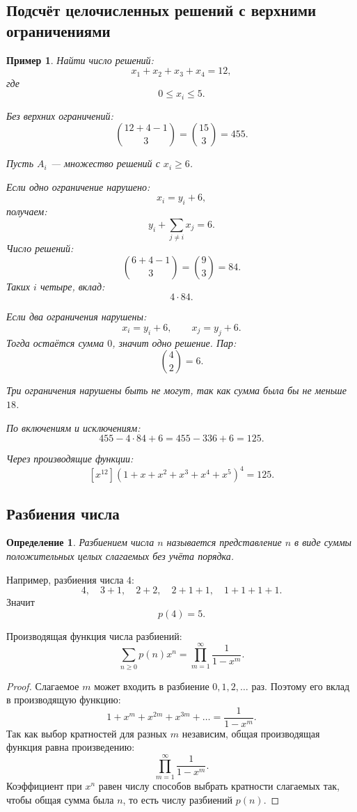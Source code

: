 \documentclass[12pt,a4paper]{article}
\newtheorem{definition}{Определение}
\newtheorem{example}{Пример}
\begin{document}
\subsection{Подсчёт целочисленных решений с верхними ограничениями}

\begin{example}
Найти число решений:
\[
x_1+x_2+x_3+x_4=12,
\]
где
\[
0\le x_i\le 5.
\]

Без верхних ограничений:
\[
\binom{12+4-1}{3}=\binom{15}{3}=455.
\]

Пусть $A_i$ --- множество решений с $x_i\ge 6$.

Если одно ограничение нарушено:
\[
x_i=y_i+6,
\]
получаем:
\[
y_i+\sum_{j\ne i}x_j=6.
\]
Число решений:
\[
\binom{6+4-1}{3}=\binom{9}{3}=84.
\]
Таких $i$ четыре, вклад:
\[
4\cdot 84.
\]

Если два ограничения нарушены:
\[
x_i=y_i+6,\qquad x_j=y_j+6.
\]
Тогда остаётся сумма $0$, значит одно решение. Пар:
\[
\binom{4}{2}=6.
\]

Три ограничения нарушены быть не могут, так как сумма была бы не меньше $18$.

По включениям и исключениям:
\[
455-4\cdot84+6=455-336+6=125.
\]

Через производящие функции:
\[
[x^{12}](1+x+x^2+x^3+x^4+x^5)^4=125.
\]
\end{example}

\subsection{Разбиения числа}

\begin{definition}
Разбиением числа $n$ называется представление $n$ в виде суммы положительных целых слагаемых без учёта порядка.
\end{definition}

Например, разбиения числа $4$:
\[
4,\quad 3+1,\quad 2+2,\quad 2+1+1,\quad 1+1+1+1.
\]
Значит
\[
p(4)=5.
\]

Производящая функция числа разбиений:
\[
\sum_{n\ge 0}p(n)x^n
=
\prod_{m=1}^{\infty}\frac{1}{1-x^m}.
\]

\begin{proof}
Слагаемое $m$ может входить в разбиение $0,1,2,\dots$ раз. Поэтому его вклад в производящую функцию:
\[
1+x^m+x^{2m}+x^{3m}+\dots=\frac{1}{1-x^m}.
\]
Так как выбор кратностей для разных $m$ независим, общая производящая функция равна произведению:
\[
\prod_{m=1}^{\infty}\frac{1}{1-x^m}.
\]
Коэффициент при $x^n$ равен числу способов выбрать кратности слагаемых так, чтобы общая сумма была $n$, то есть числу разбиений $p(n)$.
\end{proof}
\end{document}
